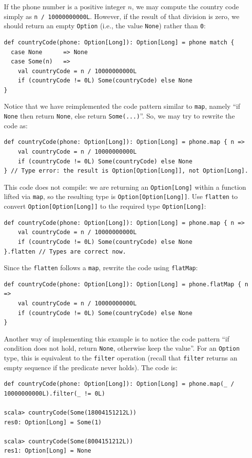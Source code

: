 If the phone number is a positive integer $n$, we may compute the
country code simply as \lstinline!n / 10000000000L!. However, if
the result of that division is zero, we should return an empty \lstinline!Option!
(i.e., the value \lstinline!None!) rather than \lstinline!0!:
\begin{lstlisting}
def countryCode(phone: Option[Long]): Option[Long] = phone match {
  case None      => None
  case Some(n)   =>
    val countryCode = n / 10000000000L
    if (countryCode != 0L) Some(countryCode) else None 
}
\end{lstlisting}
Notice that we have reimplemented the code pattern similar to \lstinline!map!,
namely \textsf{``}if \lstinline!None! then return \lstinline!None!, else
return \lstinline!Some(...)!\textsf{''}. So, we may try to rewrite the code
as:
\begin{lstlisting}
def countryCode(phone: Option[Long]): Option[Long] = phone.map { n =>
    val countryCode = n / 10000000000L
    if (countryCode != 0L) Some(countryCode) else None 
} // Type error: the result is Option[Option[Long]], not Option[Long].
\end{lstlisting}
This code does not compile: we are returning an \lstinline!Option[Long]!
within a function lifted via \lstinline!map!, so the resulting type
is \lstinline!Option[Option[Long]]!. Use \lstinline!flatten! to
convert \lstinline!Option[Option[Long]]! to the required type \lstinline!Option[Long]!:
\begin{lstlisting}
def countryCode(phone: Option[Long]): Option[Long] = phone.map { n =>
    val countryCode = n / 10000000000L
    if (countryCode != 0L) Some(countryCode) else None 
}.flatten // Types are correct now.
\end{lstlisting}
Since the \lstinline!flatten! follows a \lstinline!map!, rewrite
the code using \lstinline!flatMap!:
\begin{lstlisting}
def countryCode(phone: Option[Long]): Option[Long] = phone.flatMap { n =>
    val countryCode = n / 10000000000L
    if (countryCode != 0L) Some(countryCode) else None 
}
\end{lstlisting}

Another way of implementing this example is to notice the code pattern
\textsf{``}if condition does not hold, return \lstinline!None!, otherwise
keep the value\textsf{''}. For an \lstinline!Option! type, this is equivalent
to the \lstinline!filter! operation (recall that \lstinline!filter!
returns an empty sequence if the predicate never holds). The code
is:
\begin{lstlisting}
def countryCode(phone: Option[Long]): Option[Long] = phone.map(_ / 10000000000L).filter(_ != 0L)

scala> countryCode(Some(18004151212L))
res0: Option[Long] = Some(1)

scala> countryCode(Some(8004151212L))
res1: Option[Long] = None
\end{lstlisting}


